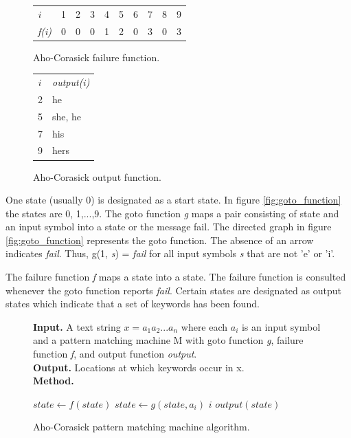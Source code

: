 \documentclass[thesis=M,english]{FITthesis}[2011/07/15]
\begin{document}
\begin{figure}[h]
\centering
\begin{tabular}{l l l l l l l l l l}
\emph{i}       & 1 & 2 & 3 & 4 & 5 & 6 & 7 & 8 & 9 \\
\emph{f(i)}    & 0 & 0 & 0 & 1 & 2 & 0 & 3 & 0 & 3 \\
\end{tabular}
\caption{Aho-Corasick failure function.}
\label{fig:failure_function}
\end{figure}

\begin{figure}[h]
\centering
\begin{tabular}{l l}
\emph{i} & \emph{output(i)} \\
2 & {he} \\
5 & {she, he} \\
7 & {his} \\
9 & {hers} \\
\end{tabular}
\caption{Aho-Corasick output function.}
\label{fig:output_function}
\end{figure}

One state (usually 0) is designated as a start state. In figure \ref{fig:goto_function} the states are 0, 1,...,9. The goto function \emph{g} maps a pair consisting of state and an input symbol into a state or the message fail. The directed graph in figure \ref{fig:goto_function} represents the goto function. The absence of an arrow indicates \emph{fail}. Thus, g(1, \emph{s}) = \emph{fail} for all input symbols \emph{s} that are not 'e' or 'i'.

The failure function \emph{f} maps a state into a state. The failure function is consulted whenever the goto function reports \emph{fail}. Certain states are designated as output states which indicate that a set of keywords has been found.

\begin{figure}[h]
\textbf{Input.} A text string $x = a_1 a_2 ... a_n$ where each $a_i$ is an input symbol and a pattern matching machine M with goto function \emph{g}, failure function \emph{f}, and output function \emph{output}.\\
\textbf{Output.} Locations at which keywords occur in x.\\
\textbf{Method.}
\begin{algorithmic}
\STATE $state \leftarrow f(state)$
\ENDWHILE
\STATE $state \leftarrow g(state, a_i)$
\PRINT $i$
\PRINT $output(state)$
\ENDIF
\ENDFOR
\end{algorithmic}
\caption{Aho-Corasick pattern matching machine algorithm.}
\label{fig:ac_search_pseudocode}
\end{figure}
\end{document}
